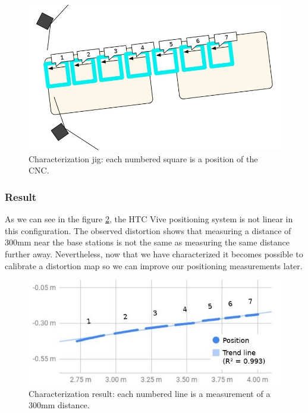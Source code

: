 \documentclass[sigchi]{acmart}
\begin{document}
\begin{figure}[h]
  \centering
  \includegraphics[width=\linewidth]{Figures/characterization_jig.jpg}
  \caption{Characterization jig: each numbered square is a position of the CNC.}
  \label{Fig:characterization_jig}
\end{figure}

\subsubsection{Result}
As we can see in the figure \ref{Fig:characterization_result}, the HTC Vive positioning system is not linear in this configuration. The observed distortion shows that measuring a distance of 300mm near the base stations is not the same as measuring the same distance further away. Nevertheless, now that we have characterized it becomes possible to calibrate a distortion map so we can improve our positioning measurements later.

\begin{figure}[h]
  \centering
  \includegraphics[width=\linewidth]{Figures/characterization_result.jpg}
  \caption{Characterization result: each numbered line is a measurement of a 300mm distance.}
  \label{Fig:characterization_result}
\end{figure}
\end{document}
